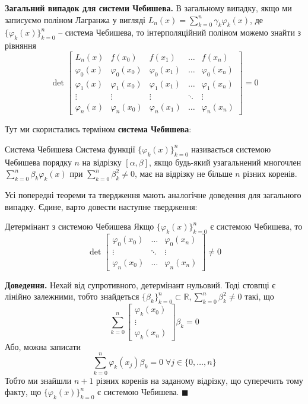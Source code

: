 \documentclass[14pt]{extarticle}
\begin{document}
\textbf{Загальний випадок для системи Чебишева.} В загальному випадку, якщо ми записуємо поліном Лагранжа у вигляді $L_n(x)=\sum_{k=0}^n \gamma_k\varphi_k(x)$, де $\{\varphi_k(x)\}_{k=0}^n$ -- система Чебишева, то інтерполяційний поліном можемо знайти з рівняння
\[
\det\begin{bmatrix}
    L_n(x) & f(x_0) & f(x_1) & \dots & f(x_n) \\
    \varphi_0(x) & \varphi_0(x_0) & \varphi_0(x_1) & \dots & \varphi_0(x_n) \\
    \varphi_1(x) & \varphi_1(x_0) & \varphi_1(x_1) & \dots & \varphi_1(x_n) \\
    \vdots & \vdots & \vdots & \ddots & \vdots \\
    \varphi_n(x) & \varphi_n(x_0) & \varphi_n(x_1) & \dots & \varphi_n(x_n) 
\end{bmatrix} = 0
\]

Тут ми скористались терміном \textbf{система Чебишева}:

\begin{def*}{Система Чебишева}
    Система функції $\{\varphi_k(x)\}_{k=0}^n$ називається системою Чебишева порядку $n$ на відрізку $[\alpha,\beta]$, якщо будь-який узагальнений многочлен $\sum_{k=0}^n\beta_k\varphi_k(x)$ при $\sum_{k=0}^n\beta_k^2 \neq 0$, має на відрізку не більше $n$ різних коренів.
\end{def*}

Усі попередні теореми та твердження мають аналогічне доведення для загального випадку. Єдине, варто довести наступне твердження:
\begin{statement*}{Детермінант з системою Чебишева}
Якщо $\{\varphi_k(x)\}_{k=0}^n$ є системою Чебишева, то
\[
\det \begin{bmatrix}
    \varphi_0(x_0) & \dots & \varphi_0(x_n) \\
    \vdots & \ddots & \vdots \\
    \varphi_n(x_0) & \dots & \varphi_n(x_n)
\end{bmatrix} \neq 0
\]
\end{statement*}

\textbf{Доведення.} Нехай від супротивного, детермінант нульовий. Тоді стовпці є лінійно залежними, тобто знайдеться $\{\beta_k\}_{k=0}^n \subset \mathbb{R}, \sum_{k=0}^n \beta_k^2 \neq 0$ такі, що
\[
\sum_{k=0}^n\begin{bmatrix}
    \varphi_k(x_0) \\ \vdots \\ \varphi_k(x_n)
\end{bmatrix}\beta_k = 0
\]
Або, можна записати
\[
\sum_{k=0}^n \varphi_k(x_j)\beta_k = 0 \; \forall j \in \{0,\dots,n\}
\]
Тобто ми знайшли $n+1$ різних коренів на заданому відрізку, що суперечить тому факту, що $\{\varphi_k(x)\}_{k=0}^n$ є системою Чебишева. $\blacksquare$
\end{document}

